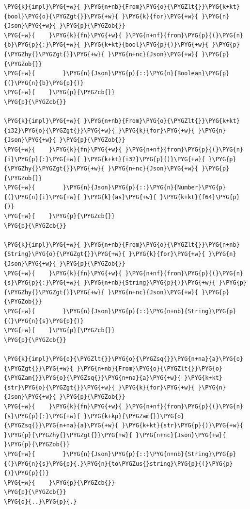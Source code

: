 \begin{Verbatim}[commandchars=\\\{\},breaklines=true,breakanywhere=true,fontsize=\codefont,xleftmargin=17bp]
\PYG{k}{impl}\PYG{+w}{ }\PYG{n+nb}{From}\PYG{o}{\PYGZlt{}}\PYG{k+kt}{bool}\PYG{o}{\PYGZgt{}}\PYG{+w}{ }\PYG{k}{for}\PYG{+w}{ }\PYG{n}{Json}\PYG{+w}{ }\PYG{p}{\PYGZob{}}
\PYG{+w}{    }\PYG{k}{fn}\PYG{+w}{ }\PYG{n+nf}{from}\PYG{p}{(}\PYG{n}{b}\PYG{p}{:}\PYG{+w}{ }\PYG{k+kt}{bool}\PYG{p}{)}\PYG{+w}{ }\PYG{p}{\PYGZhy{}\PYGZgt{}}\PYG{+w}{ }\PYG{n+nc}{Json}\PYG{+w}{ }\PYG{p}{\PYGZob{}}
\PYG{+w}{        }\PYG{n}{Json}\PYG{p}{::}\PYG{n}{Boolean}\PYG{p}{(}\PYG{n}{b}\PYG{p}{)}
\PYG{+w}{    }\PYG{p}{\PYGZcb{}}
\PYG{p}{\PYGZcb{}}

\PYG{k}{impl}\PYG{+w}{ }\PYG{n+nb}{From}\PYG{o}{\PYGZlt{}}\PYG{k+kt}{i32}\PYG{o}{\PYGZgt{}}\PYG{+w}{ }\PYG{k}{for}\PYG{+w}{ }\PYG{n}{Json}\PYG{+w}{ }\PYG{p}{\PYGZob{}}
\PYG{+w}{    }\PYG{k}{fn}\PYG{+w}{ }\PYG{n+nf}{from}\PYG{p}{(}\PYG{n}{i}\PYG{p}{:}\PYG{+w}{ }\PYG{k+kt}{i32}\PYG{p}{)}\PYG{+w}{ }\PYG{p}{\PYGZhy{}\PYGZgt{}}\PYG{+w}{ }\PYG{n+nc}{Json}\PYG{+w}{ }\PYG{p}{\PYGZob{}}
\PYG{+w}{        }\PYG{n}{Json}\PYG{p}{::}\PYG{n}{Number}\PYG{p}{(}\PYG{n}{i}\PYG{+w}{ }\PYG{k}{as}\PYG{+w}{ }\PYG{k+kt}{f64}\PYG{p}{)}
\PYG{+w}{    }\PYG{p}{\PYGZcb{}}
\PYG{p}{\PYGZcb{}}

\PYG{k}{impl}\PYG{+w}{ }\PYG{n+nb}{From}\PYG{o}{\PYGZlt{}}\PYG{n+nb}{String}\PYG{o}{\PYGZgt{}}\PYG{+w}{ }\PYG{k}{for}\PYG{+w}{ }\PYG{n}{Json}\PYG{+w}{ }\PYG{p}{\PYGZob{}}
\PYG{+w}{    }\PYG{k}{fn}\PYG{+w}{ }\PYG{n+nf}{from}\PYG{p}{(}\PYG{n}{s}\PYG{p}{:}\PYG{+w}{ }\PYG{n+nb}{String}\PYG{p}{)}\PYG{+w}{ }\PYG{p}{\PYGZhy{}\PYGZgt{}}\PYG{+w}{ }\PYG{n+nc}{Json}\PYG{+w}{ }\PYG{p}{\PYGZob{}}
\PYG{+w}{        }\PYG{n}{Json}\PYG{p}{::}\PYG{n+nb}{String}\PYG{p}{(}\PYG{n}{s}\PYG{p}{)}
\PYG{+w}{    }\PYG{p}{\PYGZcb{}}
\PYG{p}{\PYGZcb{}}

\PYG{k}{impl}\PYG{o}{\PYGZlt{}}\PYG{o}{\PYGZsq{}}\PYG{n+na}{a}\PYG{o}{\PYGZgt{}}\PYG{+w}{ }\PYG{n+nb}{From}\PYG{o}{\PYGZlt{}}\PYG{o}{\PYGZam{}}\PYG{o}{\PYGZsq{}}\PYG{n+na}{a}\PYG{+w}{ }\PYG{k+kt}{str}\PYG{o}{\PYGZgt{}}\PYG{+w}{ }\PYG{k}{for}\PYG{+w}{ }\PYG{n}{Json}\PYG{+w}{ }\PYG{p}{\PYGZob{}}
\PYG{+w}{    }\PYG{k}{fn}\PYG{+w}{ }\PYG{n+nf}{from}\PYG{p}{(}\PYG{n}{s}\PYG{p}{:}\PYG{+w}{ }\PYG{k+kp}{\PYGZam{}}\PYG{o}{\PYGZsq{}}\PYG{n+na}{a}\PYG{+w}{ }\PYG{k+kt}{str}\PYG{p}{)}\PYG{+w}{ }\PYG{p}{\PYGZhy{}\PYGZgt{}}\PYG{+w}{ }\PYG{n+nc}{Json}\PYG{+w}{ }\PYG{p}{\PYGZob{}}
\PYG{+w}{        }\PYG{n}{Json}\PYG{p}{::}\PYG{n+nb}{String}\PYG{p}{(}\PYG{n}{s}\PYG{p}{.}\PYG{n}{to\PYGZus{}string}\PYG{p}{(}\PYG{p}{)}\PYG{p}{)}
\PYG{+w}{    }\PYG{p}{\PYGZcb{}}
\PYG{p}{\PYGZcb{}}
\PYG{o}{..}\PYG{p}{.}
\end{Verbatim}

